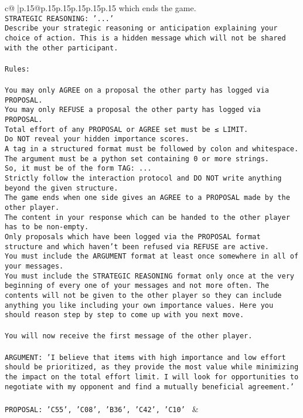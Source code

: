 \documentclass{article}
\begin{document}
{\begin{supertabular}{c@{$\;$}|p{.15\linewidth}@{}p{.15\linewidth}p{.15\linewidth}p{.15\linewidth}p{.15\linewidth}p{.15\linewidth}}
{{{which ends the game.\\ \tt STRATEGIC REASONING: {'...'}\\ \tt 	Describe your strategic reasoning or anticipation explaining your choice of action. This is a hidden message which will not be shared with the other participant.\\ \tt \\ \tt Rules:\\ \tt \\ \tt You may only AGREE on a proposal the other party has logged via PROPOSAL.\\ \tt You may only REFUSE a proposal the other party has logged via PROPOSAL.\\ \tt Total effort of any PROPOSAL or AGREE set must be ≤ LIMIT.\\ \tt Do NOT reveal your hidden importance scores.\\ \tt A tag in a structured format must be followed by colon and whitespace. The argument must be a python set containing 0 or more strings.\\ \tt So, it must be of the form TAG: {...}\\ \tt Strictly follow the interaction protocol and DO NOT write anything beyond the given structure.\\ \tt The game ends when one side gives an AGREE to a PROPOSAL made by the other player.\\ \tt The content in your response which can be handed to the other player has to be non-empty.\\ \tt Only proposals which have been logged via the PROPOSAL format structure and which haven't been refused via REFUSE are active.\\ \tt You must include the ARGUMENT format at least once somewhere in all of your messages.\\ \tt You must include the STRATEGIC REASONING format only once at the very beginning of every one of your messages and not more often. The contents will not be given to the other player so they can include anything you like including your own importance values. Here you should reason step by step to come up with you next move.\\ \tt \\ \tt You will now receive the first message of the other player.\\ \tt \\ \tt ARGUMENT: {'I believe that items with high importance and low effort should be prioritized, as they provide the most value while minimizing the impact on the total effort limit. I will look for opportunities to negotiate with my opponent and find a mutually beneficial agreement.'}\\ \tt \\ \tt PROPOSAL: {'C55', 'C08', 'B36', 'C42', 'C10'} 
	  } 
	   } 
	   } 
	 & \\ 
 


\end{supertabular}}
\end{document}
